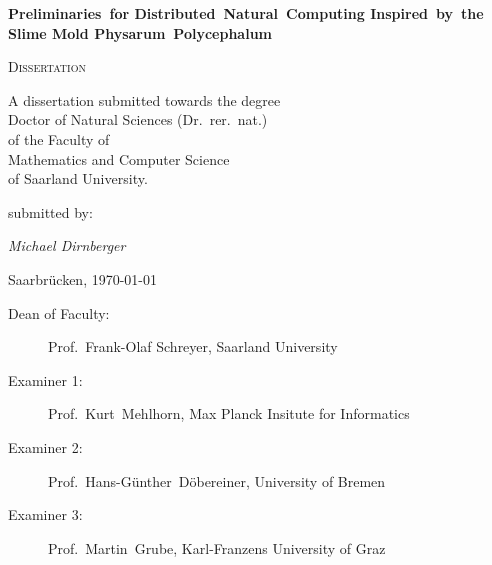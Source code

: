 
\begin{titlepage}
	\centering
	\null\vfill
	
	{\huge\bfseries Preliminaries~for Distributed~Natural~Computing Inspired~by~the Slime Mold Physarum~Polycephalum\par}
	


	\vfill

	{\scshape\Large Dissertation}
	\vfill



	{\large A dissertation submitted towards the degree\\ 
	Doctor of Natural Sciences (Dr.~rer.~nat.)\\
	of the Faculty of\\
	Mathematics and Computer Science\\
	of Saarland University.}

	\vfill
	submitted by:
	\vfill

	{\Large\itshape Michael Dirnberger}

	\vfill

	{\large Saarbr\"ucken, \thesisdate\today}
	\vfill
\end{titlepage}


\newpage
\null
\vfill
\begin{description}
 	\item[Dean of Faculty:] Prof.~Frank-Olaf Schreyer, Saarland University
	\item[Examiner 1:] Prof.~Kurt~Mehlhorn, Max Planck Insitute for Informatics
	\item[Examiner 2:] Prof.~Hans-G\"unther~D\"obereiner, University of Bremen
	\item[Examiner 3:] Prof.~Martin~Grube, Karl-Franzens University of Graz
\end{description}

\newpage
